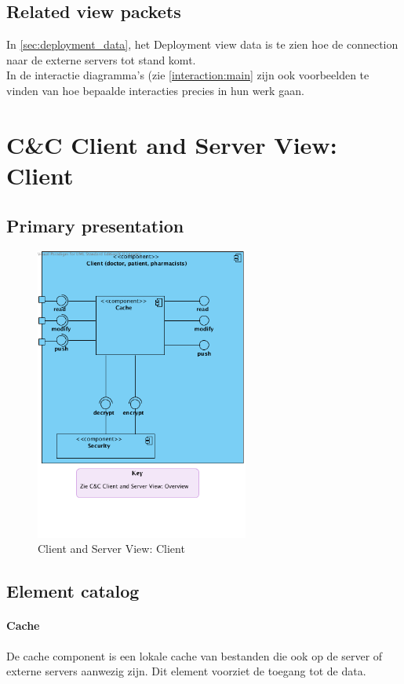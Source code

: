 \documentclass[a4paper,10pt]{article}
\begin{document}
\subsection{Related view packets}
In \ref{sec:deployment_data}, het Deployment view data is te zien hoe de connection naar de externe servers tot stand komt.\\
In de interactie diagramma's (zie \ref{interaction:main} zijn ook voorbeelden te vinden van hoe bepaalde interacties precies in hun werk gaan.


\clearpage
\section{C\&C Client and Server View: Client}
\label{Client and Server View: Client}

\subsection{Primary presentation}

\begin{figure}[!h]
  \includegraphics[width=70mm]{../images/ClientServer_Client.png}
  \caption{Client and Server View: Client}
\end{figure}

\subsection{Element catalog}

\paragraph{Cache}
De cache component is een lokale cache van bestanden die ook op de server of externe servers aanwezig zijn.  Dit element voorziet de toegang tot de data.
\end{document}
